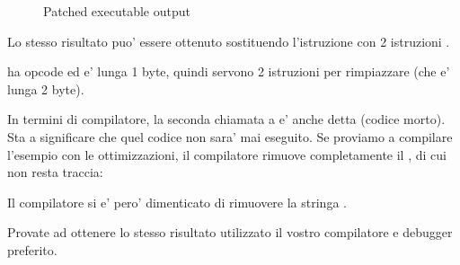 \begin{figure}[H]
\centering
{}
\caption{Patched executable output}
\label{fig:goto_result}
\end{figure}

Lo stesso risultato puo' essere ottenuto sostituendo l'istruzione \JMP con 2 istruzioni \NOP.

\NOP ha opcode  ed e' lunga 1 byte, quindi servono 2 istruzioni per rimpiazzare \JMP (che e' lunga 2 byte).


In termini di compilatore, la seconda chiamata a \printf e' anche detta  (codice morto).
Sta a significare che quel codice non sara' mai eseguito. Se proviamo a compilare l'esempio con le ottimizzazioni, il compilatore
rimuove completamente il , di cui non resta traccia:



Il compilatore si e' pero' dimenticato di rimuovere la stringa .


\sectionold{\Exercise}


Provate ad ottenere lo stesso risultato utilizzato il vostro compilatore e debugger preferito.
